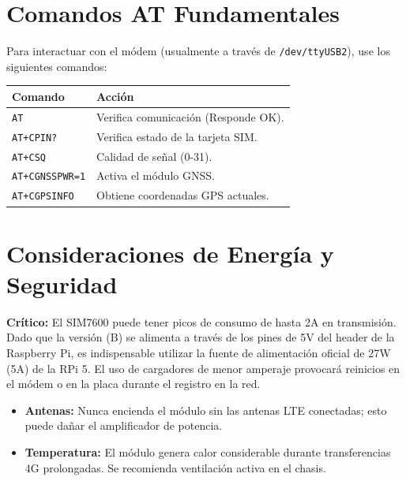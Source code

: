 \documentclass[11pt]{article}
\begin{document}
\section{Comandos AT Fundamentales}

Para interactuar con el módem (usualmente a través de \texttt{/dev/ttyUSB2}), use los siguientes comandos:

\begin{table}[h]
    \centering
    \begin{tabular}{ll}
        \toprule
        \textbf{Comando} & \textbf{Acción} \\
        \midrule
        \texttt{AT} & Verifica comunicación (Responde OK). \\
        \texttt{AT+CPIN?} & Verifica estado de la tarjeta SIM. \\
        \texttt{AT+CSQ} & Calidad de señal (0-31). \\
        \texttt{AT+CGNSSPWR=1} & Activa el módulo GNSS. \\
        \texttt{AT+CGPSINFO} & Obtiene coordenadas GPS actuales. \\
        \bottomrule
    \end{tabular}
\end{table}

\section{Consideraciones de Energía y Seguridad}

\begin{advertencia}
\textbf{Crítico:} El SIM7600 puede tener picos de consumo de hasta 2A en transmisión. Dado que la versión (B) se alimenta a través de los pines de 5V del header de la Raspberry Pi, es indispensable utilizar la fuente de alimentación oficial de 27W (5A) de la RPi 5. El uso de cargadores de menor amperaje provocará reinicios en el módem o en la placa durante el registro en la red.
\end{advertencia}

\begin{itemize}
    \item \textbf{Antenas:} Nunca encienda el módulo sin las antenas LTE conectadas; esto puede dañar el amplificador de potencia.
    \item \textbf{Temperatura:} El módulo genera calor considerable durante transferencias 4G prolongadas. Se recomienda ventilación activa en el chasis.
\end{itemize}
\end{document}
